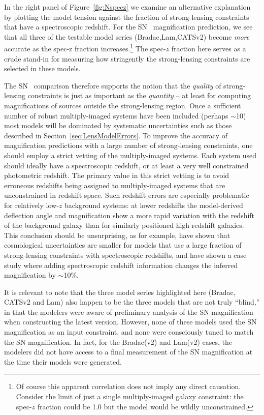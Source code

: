 In the right panel of Figure~\ref{fig:Nspecz} we examine an
alternative explanation by plotting the model tension against the
fraction of strong-lensing constraints that have a spectroscopic
redshift. 
For the SN \tomas\ magnification prediction, we see that all three of
the testable model series (Bradac,Lam,CATSv2) become {\it more}
accurate as the spec-z fraction increases.\footnote{Of course this
apparent correlation does not imply any direct causation. Consider the
limit of just a single multiply-imaged galaxy constraint: the spec-$z$
fraction could be 1.0 but the model would be wildly unconstrained.}
The spec-$z$ fraction here serves as a crude stand-in for measuring
how stringently the strong-lensing constraints are selected in these
models.

The SN \tomas\ comparison therefore supports the notion that the {\it
quality} of strong-lensing constraints is just as important as the
{\it quantity} -- at least for computing magnifications of sources
outside the strong-lensing region. Once a sufficient number of robust
multiply-imaged systems have been included (perhaps $\sim$10) most
models will be dominated by systematic uncertainties such as those
described in Section~\ref{sec:LensModelErrors}.  To improve the
accuracy of magnification predictions with a large number of
strong-lensing constraints, one should employ a strict vetting of the
multiply-imaged systems.  Each system used should ideally have a
spectroscopic redshift, or at least a very well constrained
photometric redshift.  The primary value in this strict vetting is to
avoid erroneous redshifts being assigned to multiply-imaged systems
that are unconstrained in redshift space.  Such redshift errors are
especially problematic for relatively low-$z$ background systems: at
lower redshifts the model-derived deflection angle and magnification
show a more rapid variation with the redshift of the background galaxy
than for similarly positioned high redshift galaxies. This conclusion
should be unsurprising, as for example, \citet{Bayliss:2015} have
shown that cosmological uncertainties are smaller for models that use
a large fraction of strong-lensing constraints with spectroscopic
redshifts, and \citet{Johnson:2014} have shown a case study where
adding spectroscopic redshift information changes the inferred
magnification by $\sim$10\%.



It is relevant to note that the three model series highlighted here
(Bradac, CATSv2 and Lam) also happen to be the three models that are
not truly ``blind,'' in that the modelers were aware of preliminary
analysis of the SN magnification when constructing the latest version.
However, none of these models used the SN magnification as an input
constraint, and none were consciously tuned to match the SN
magnification. In fact, for the Bradac(v2) and Lam(v2) cases, the
modelers did not have access to a final measurement of the SN
magnification at the time their models were generated.


